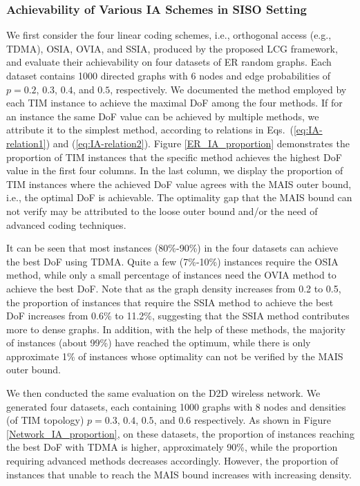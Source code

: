 \documentclass[a4paper,journal]{IEEEtran}
\begin{document}
\subsubsection{Achievability of Various IA Schemes in SISO Setting}
We first consider the four linear coding schemes, i.e., orthogonal access (e.g., TDMA), OSIA, OVIA, and SSIA, produced by the proposed LCG framework, and evaluate their achievability on four datasets of ER random graphs. Each dataset contains 1000 directed graphs with 6 nodes and edge probabilities of $p=0.2$, $0.3$, $0.4$, and $0.5$, respectively. We documented the method employed by each TIM instance to achieve the maximal DoF among the four methods. If for an instance the same DoF value can be achieved by multiple methods, we attribute it to the simplest method, according to relations in Eqs.~(\ref{eq:IA-relation1}) and (\ref{eq:IA-relation2}). Figure \ref{ER_IA_proportion} demonstrates the proportion of TIM instances that the specific method achieves the highest DoF value in the first four columns. In the last column, we display the proportion of TIM instances where the achieved DoF value agrees with the MAIS outer bound, i.e., the optimal DoF is achievable. The optimality gap that the MAIS bound can not verify may be attributed to the loose outer bound and/or the need of advanced coding techniques.

It can be seen that most instances (80\%-90\%) in the four datasets can achieve the best DoF using TDMA. Quite a few (7\%-10\%) instances require the OSIA method, while only a small percentage of instances need the OVIA method to achieve the best DoF. Note that as the graph density increases from 0.2 to 0.5, the proportion of instances that require the SSIA method to achieve the best DoF increases from 0.6\% to 11.2\%, suggesting that the SSIA method contributes more to dense graphs. In addition, with the help of these methods, the majority of instances (about 99\%) have reached the optimum, while there is only approximate 1\% of instances whose optimality can not be verified by the MAIS outer bound.

We then conducted the same evaluation on the D2D wireless network. We generated four datasets, each containing 1000 graphs with 8 nodes and densities (of TIM topology) $p=0.3$, $0.4$, $0.5$, and $0.6$ respectively. As shown in Figure \ref{Network_IA_proportion}, on these datasets, the proportion of instances reaching the best DoF with TDMA is higher, approximately 90\%, while the proportion requiring advanced methods decreases accordingly. However, the proportion of instances that unable to reach the MAIS bound increases with increasing density.
\end{document}

